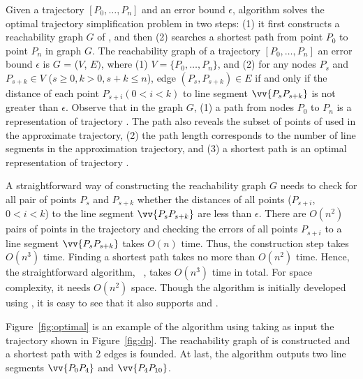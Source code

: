 Given a trajectory ${[P_0, \ldots, P_n]}$ and an error bound $\epsilon$, algorithm \opt \cite{Imai:Optimal} solves the optimal trajectory simplification problem  in two steps: (1) it first constructs a reachability graph $G$ of , and then (2) searches a shortest path from point $P_0$ to point $P_{n}$ in graph $G$.
%
The reachability graph of a trajectory ${[P_0, \ldots, P_n]}$ \wrt an error bound $\epsilon$ is $G$ = ($V$, $E)$, where (1) $V = \{P_0, \ldots, P_n\}$, and (2) for any nodes $P_s$ and $P_{s+k} \in V$ ($s\ge 0, k>0, s+k\le n$), edge $(P_s, P_{s+k}) \in E$ if and only if the distance of each point $P_{s+i} (0<i<k)$ to line segment $\vv{P_sP_{s+k}}$ is not greater than $\epsilon$.
%
Observe that in the graph $G$, (1) a path from nodes $P_0$ to $P_{n}$ is a representation of trajectory . The path also reveals the subset of points of  used in the approximate trajectory, (2) the path length corresponds to the number of line segments in the approximation trajectory, and
(3) a shortest path is an optimal representation of trajectory .

A straightforward way of constructing the reachability graph $G$ needs to check for all pair of points $P_s$ and $P_{s+k}$ whether the distances of all points ($P_{s+i}$, $0<i<k$) to the line segment $\vv{P_sP_{s+k}}$ are less than $\epsilon$.
There are $O(n^2)$ pairs of points in the trajectory and checking the errors of all points $P_{s+i}$ to a line segment $\vv{P_sP_{s+k}}$ takes $O(n)$ time.
Thus, the construction step takes $O(n^3)$ time.
Finding a shortest path takes no more than $O(n^2)$ time. Hence, the straightforward algorithm, \ie~\opt, takes $O(n^3)$ time in total.
For space complexity, it needs $O(n^2)$ space.
%
Though the algorithm is initially developed using \ped, it is easy to see that it also supports \sed and \dad.


\begin{example}
	\label{exm-alg-optimal}
	Figure~\ref{fig:optimal} is an example of the \opt algorithm using \ped taking as input the trajectory  shown in Figure~\ref{fig:dp}. The reachability graph of  is constructed and a shortest path with 2 edges is founded.
	At last, the algorithm outputs two line segments $\vv{P_0P_4}$ and $\vv{P_4P_{10}}$.	
\end{example}
\vspace{-1ex}

